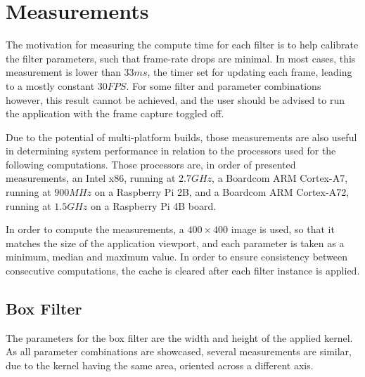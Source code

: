\chapter{Measurements}


The motivation for measuring the compute time for each filter is to help calibrate the filter parameters,
such that frame-rate drops are minimal. In most cases, this measurement is lower than \(33ms\), the timer
set for updating each frame, leading to a mostly constant \(30FPS\). For some filter and parameter
combinations however, this result cannot be achieved, and the user should be advised to run the application
with the frame capture toggled off.

Due to the potential of multi-platform builds, those measurements are also useful in determining system
performance in relation to the processors used for the following computations. Those processors are, in
order of presented measurements, an Intel x86, running at \(2.7GHz\), a Boardcom ARM Cortex-A7, running at
\(900MHz\) on a Raspberry Pi 2B, and a Boardcom ARM Cortex-A72, running at \(1.5GHz\) on a Raspberry Pi 4B
board. \cite{raspi2, raspi4}

In order to compute the measurements, a \(400 \times 400\) image is used, so that it matches the size of
the application viewport, and each parameter is taken as a minimum, median and maximum value. In order to
ensure consistency between consecutive computations, the cache is cleared after each filter instance is
applied.

\section{Box Filter}

The parameters for the box filter are the width and height of the applied kernel. As all parameter
combinations are showcased, several measurements are similar, due to the kernel having the same area,
oriented across a different axis.

